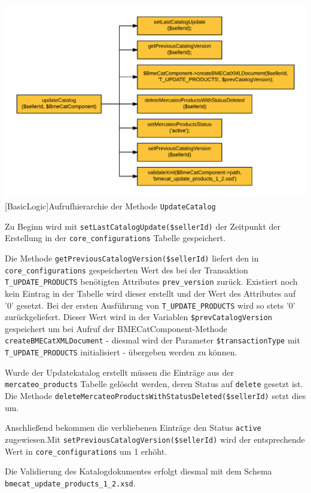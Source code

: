 	\begin{minipage}{\linewidth}
		\vspace{1em}
		\centering
		\includegraphics[width=0.7 \linewidth]{img/updateKatalogAufrufhierarchie}
		[BasicLogic]{Aufrufhierarchie der Methode \texttt{UpdateCatalog}}
		\vspace{1em}
	\end{minipage}
	
	Zu Beginn wird mit \texttt{setLastCatalogUpdate(\$sellerId)} der Zeitpunkt der Erstellung in der \texttt{core\_configurations} Tabelle gespeichert.  
	
	Die Methode \texttt{getPreviousCatalogVersion(\$sellerId)} liefert den in \texttt{core\_configurations} gespeicherten Wert des bei der Transaktion \texttt{T\_UPDATE\_PRODUCTS} benötigten Attributes \texttt{prev\_version} zurück. Existiert noch kein Eintrag in der Tabelle wird dieser erstellt und der Wert des Attributes auf '0' gesetzt. Bei der ersten Ausführung von \texttt{T\_UPDATE\_PRODUCTS} wird so stets '0' zurückgeliefert. Dieser Wert wird in der Variablen \texttt{\$prevCatalogVersion} gespeichert um bei Aufruf der BMECatComponent-Methode \texttt{createBMECatXMLDocument} - diesmal wird der Parameter \texttt{\$transactionType} mit \texttt{T\_UPDATE\_PRODUCTS} initialisiert - übergeben werden zu können.
	
	Wurde der Updatekatalog erstellt müssen die Einträge aus der \texttt{mercateo\_products} Tabelle gelöscht werden, deren Status auf \texttt{delete} gesetzt ist. Die Methode \texttt{deleteMercateoProductsWithStatusDeleted(\$sellerId)} setzt dies um.
	
	Anschließend bekommen die verbliebenen Einträge den Status \texttt{active} zugewiesen.Mit \texttt{setPreviousCatalogVersion(\$sellerId)} wird der entsprechende Wert in \texttt{core\_configurations} um 1 erhöht.
	
	Die Validierung des Katalogdokumentes erfolgt diesmal mit dem Schema \texttt{bmecat\_update\_products\_1\_2.xsd}.
	
